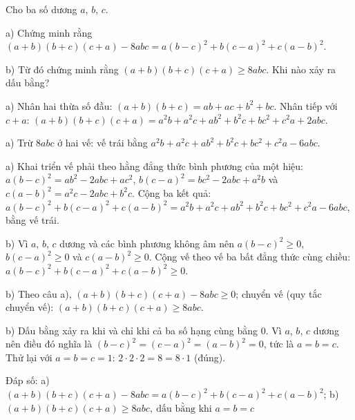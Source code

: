 \begin{problem}[9DS-BPT-050]
Cho ba số dương $a$, $b$, $c$.

a) Chứng minh rằng $(a + b)(b + c)(c + a) - 8abc = a(b - c)^2 + b(c - a)^2 + c(a - b)^2$.

b) Từ đó chứng minh rằng $(a + b)(b + c)(c + a) \geq 8abc$. Khi nào xảy ra dấu bằng?

\begin{solution}
a) Nhân hai thừa số đầu: $(a + b)(b + c) = ab + ac + b^2 + bc$. Nhân tiếp với $c + a$: $(a + b)(b + c)(c + a) = a^2b + a^2c + ab^2 + b^2c + bc^2 + c^2a + 2abc$.

a) Trừ $8abc$ ở hai vế: vế trái bằng $a^2b + a^2c + ab^2 + b^2c + bc^2 + c^2a - 6abc$.

a) Khai triển vế phải theo hằng đẳng thức bình phương của một hiệu: $a(b - c)^2 = ab^2 - 2abc + ac^2$, $b(c - a)^2 = bc^2 - 2abc + a^2b$ và $c(a - b)^2 = a^2c - 2abc + b^2c$. Cộng ba kết quả: $a(b - c)^2 + b(c - a)^2 + c(a - b)^2 = a^2b + a^2c + ab^2 + b^2c + bc^2 + c^2a - 6abc$, bằng vế trái.

b) Vì $a$, $b$, $c$ dương và các bình phương không âm nên $a(b - c)^2 \geq 0$, $b(c - a)^2 \geq 0$ và $c(a - b)^2 \geq 0$. Cộng vế theo vế ba bất đẳng thức cùng chiều: $a(b - c)^2 + b(c - a)^2 + c(a - b)^2 \geq 0$.

b) Theo câu a), $(a + b)(b + c)(c + a) - 8abc \geq 0$; chuyển vế (quy tắc chuyển vế): $(a + b)(b + c)(c + a) \geq 8abc$.

b) Dấu bằng xảy ra khi và chỉ khi cả ba số hạng cùng bằng $0$. Vì $a$, $b$, $c$ dương nên điều đó nghĩa là $(b - c)^2 = (c - a)^2 = (a - b)^2 = 0$, tức là $a = b = c$. Thử lại với $a = b = c = 1$: $2 \cdot 2 \cdot 2 = 8 = 8 \cdot 1$ (đúng).

Đáp số: a) $\boxed{(a + b)(b + c)(c + a) - 8abc = a(b - c)^2 + b(c - a)^2 + c(a - b)^2}$; b) $\boxed{(a + b)(b + c)(c + a) \geq 8abc,\ \text{dấu bằng khi } a = b = c}$
\end{solution}
\end{problem}

